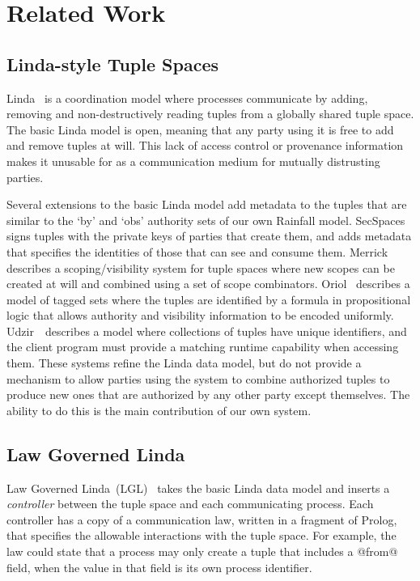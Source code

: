 

\label{s:Related}
\section{Related Work}

\subsection{Linda-style Tuple Spaces}
Linda~\cite{Gelernter1985:Linda} is a coordination model where processes communicate by adding, removing and non-destructively reading tuples from a globally shared tuple space. The basic Linda model is open, meaning that any party using it is free to add and remove tuples at will. This lack of access control or provenance information makes it unusable for as a communication medium for mutually distrusting parties.

Several extensions to the basic Linda model add metadata to the tuples that are similar to the `by' and `obs' authority sets of our own Rainfall model. SecSpaces~\cite{Busi2003:SecSpaces} signs tuples with the private keys of parties that create them, and adds metadata that specifies the identities of those that can see and consume them. Merrick~\cite{Merrick2000:Scopes} describes a scoping/visibility system for tuple spaces where new scopes can be created at will and combined using a set of scope combinators. Oriol~\cite{Oriol2005:TaggedSets} describes a model of tagged sets where the tuples are identified by a formula in propositional logic that allows authority and visibility information to be encoded uniformly. Udzir~\cite{Udzir2007:MultiCapabilities}~describes a model where collections of tuples have unique identifiers, and the client program must provide a matching runtime capability when accessing them. These systems refine the Linda data model, but do not provide a mechanism to allow parties using the system to combine authorized tuples to produce new ones that are authorized by any other party except themselves. The ability to do this is the main contribution of our own system.


\subsection{Law Governed Linda}
Law Governed Linda~(LGL)~\cite{Minsky1994:LawGovernedLinda, Minsky2001:SafeTupleSpace} takes the basic Linda data model and inserts a \emph{controller} between the tuple space and each communicating process. Each controller has a copy of a communication law, written in a fragment of Prolog, that specifies the allowable interactions with the tuple space. For example, the law could  state that a process may only create a tuple that includes a @from@ field, when the value in that field is its own process identifier.

